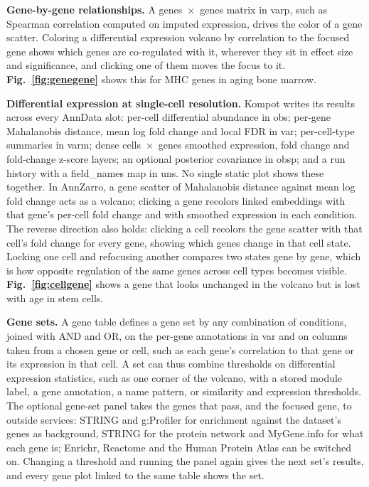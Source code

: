 \textbf{Gene-by-gene relationships.} A genes~$\times$~genes matrix in varp, such as Spearman correlation computed on imputed expression, drives the color of a gene scatter. Coloring a differential expression volcano by correlation to the focused gene shows which genes are co-regulated with it, wherever they sit in effect size and significance, and clicking one of them moves the focus to it. 
\textbf{Fig.~\ref{fig:genegene}} shows this for MHC genes in aging bone marrow.

\textbf{Differential expression at single-cell resolution.} Kompot \cite{otto2025kompot} writes its results across every AnnData slot: per-cell differential abundance in obs; per-gene Mahalanobis distance, mean log fold change and local FDR in var; per-cell-type summaries in varm; dense cells~$\times$~genes smoothed expression, fold change and fold-change z-score layers; an optional posterior covariance in obsp; and a run history with a field\_names map in uns. No single static plot shows these together. In AnnZarro, a gene scatter of Mahalanobis distance against mean log fold change acts as a volcano; clicking a gene recolors linked embeddings with that gene's per-cell fold change and with smoothed expression in each condition. The reverse direction also holds: clicking a cell recolors the gene scatter with that cell's fold change for every gene, showing which genes change in that cell state. Locking one cell and refocusing another compares two states gene by gene, which is how opposite regulation of the same genes across cell types becomes visible. \textbf{Fig.~\ref{fig:cellgene}} shows a gene that looks unchanged in the volcano but is lost with age in stem cells.

\textbf{Gene sets.} A gene table defines a gene set by any combination of conditions, joined with AND and OR, on the per-gene annotations in var and on columns taken from a chosen gene or cell, such as each gene's correlation to that gene or its expression in that cell. A set can thus combine thresholds on differential expression statistics, such as one corner of the volcano, with a stored module label, a gene annotation, a name pattern, or similarity and expression thresholds. The optional gene-set panel takes the genes that pass, and the focused gene, to outside services: STRING and g:Profiler for enrichment against the dataset's genes as background, STRING for the protein network and MyGene.info for what each gene is; Enrichr, Reactome and the Human Protein Atlas can be switched on. Changing a threshold and running the panel again gives the next set's results, and every gene plot linked to the same table shows the set.

